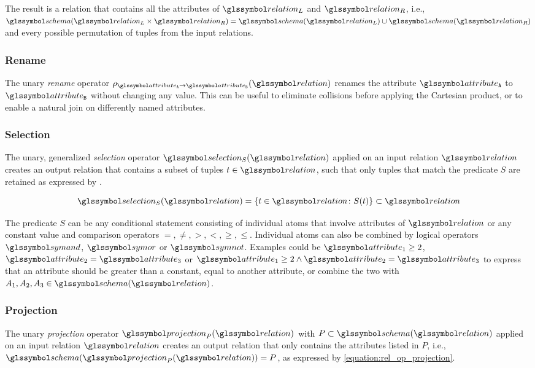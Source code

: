The result is a relation that contains all the attributes of $\relation_L$ and $\relation_R$, i.e., $\schema(\relation_L \times \relation_R) = \schema(\relation_L) \cup \schema(\relation_R)$ and every possible permutation of tuples from the input relations.

\subsubsection{Rename}
The unary \emph{rename} operator $\rho_{\attribute_\mathtt{A} \rightarrow \attribute_\mathtt{B}}(\relation)$ renames the attribute $\attribute_\mathtt{A}$ to $\attribute_\mathtt{B}$ without changing any value. This can be useful to eliminate collisions before applying the Cartesian product, or to enable a natural join on differently named attributes.

\subsubsection{Selection}

The unary, generalized \emph{selection} operator $\selection_{S}(\relation)$ applied on an input relation $\relation$ creates an output relation that contains a subset of tuples $t \in \relation$, such that only tuples that match the predicate $S$ are retained as expressed by .

\begin{equation}
    \label{equation:rel_op_selection}
    \selection_{S}(\relation) = \{ t \in \relation \colon S(t) \} \subset \relation
\end{equation}

The predicate $S$ can be any conditional statement consisting of individual atoms that involve attributes of $\relation$ or any constant value and comparison operators $=,\neq,>,<,\geq, \leq$. Individual atoms can also be combined by logical operators $\symand$, $\symor$ or $\symnot$. Examples could be $\attribute_1 \geq 2$, $\attribute_2 = \attribute_3$ or $\attribute_1 \geq 2 \wedge \attribute_2 = \attribute_3$ to express that an attribute should be greater than a constant, equal to another attribute, or combine the two with $A_1,A_2,A_3 \in \schema(\relation)$.


\subsubsection{Projection}
The unary \emph{projection} operator $\projection_{P}(\relation)$ with $P \subset \schema(\relation)$ applied on an input relation $\relation$ creates an output relation that only contains the attributes listed in $P$, i.e., $\schema(\projection_{P}(\relation)) = P$, as expressed by \cref{equation:rel_op_projection}.

